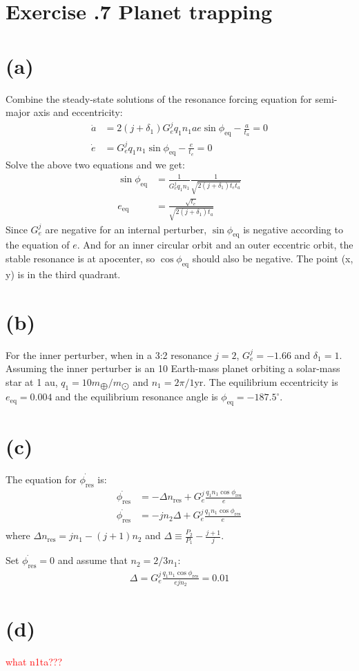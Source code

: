 \documentclass[a4paper,12pt]{article}
\begin{document}
\section*{\textbf{Exercise \uppercase\expandafter{}.7 Planet trapping}}
\section*{(a)}
Combine the steady-state solutions of the resonance forcing equation for semi-major axis and 
eccentricity:
\begin{align*}
    \dot{a} &= 2(j+\delta_1) G_e^j q_1 n_1 a e \sin \phi_{\text{eq}} - \frac{a}{t_a} = 0\\
    \dot{e} &= G_e^j q_1 n_1 \sin \phi_{\text{eq}} - \frac{e}{t_e} = 0
\end{align*}
Solve the above two equations and we get:
\begin{align*}
    \sin\phi_{\text{eq}} &= \frac{1}{G_e^j q_1 n_1} \frac{1}{\sqrt{2(j+\delta_1)t_e t_a}}\\
    e_{\text{eq}} &= \frac{\sqrt{t_e}}{\sqrt{2(j+\delta_1)t_a}}
\end{align*}
Since $G_e^j$ are negative for an internal perturber, $\sin \phi_{\text{eq}}$ is negative according to the equation of $e$.
And for an inner circular orbit and an outer eccentric orbit, the stable resonance is at apocenter, so 
$\cos \phi_{\text{eq}}$ should also be negative. The point (x, y) is in the third quadrant.

\section*{(b)}
For the inner perturber, when in a 3:2 resonance $j=2$, $G_e^j = -1.66$ and $\delta_1 = 1$.
Assuming the inner perturber is an 10 Earth-mass planet orbiting a solar-mass star at 1 au, 
$q_1 = 10m_{\bigoplus}/m_{\bigodot}$ and $n_1 = 2\pi/1 $yr.
The equilibrium eccentricity is $e_{\text{eq}} = 0.004$ and the equilibrium resonance angle is 
$\phi_{\text{eq}} = -187.5 ^{\circ}$.

\section*{(c)}
The equation for $\dot{\phi_{\text{res}}}$ is:
\begin{align*}
    \dot{\phi_{\text{res}}} &= - \Delta n_{\text{res}} + G_e^j \frac{q_1 n_1 \cos \phi_{\text{res}}}{e} \\
    \dot{\phi_{\text{res}}} &= - jn_2 \Delta + G_e^j \frac{q_1 n_1 \cos \phi_{\text{res}}}{e} \\
\end{align*}
where $\Delta n_{\text{res}} = jn_1 - (j+1) n_2$ and $\Delta \equiv \frac{P_2}{P_1} - \frac{j+1}{j}$.

Set $\dot{\phi_{\text{res}}}=0$ and assume that $n_2 = 2/3 n_1$:
\begin{align*}
    \Delta = G_e^j \frac{q_1 n_1 \cos \phi_{\text{res}}}{ejn_2} = 0.01
\end{align*}

\section*{(d)}
\textcolor{red}{what n1ta???}
\end{document}
